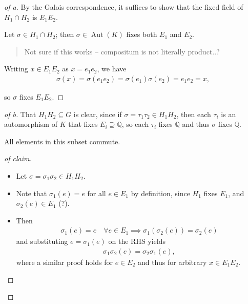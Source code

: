 \begin{solution}

\envlist

\begin{proof}[of a]

By the Galois correspondence, it suffices to show that the fixed field
of \(H_1 \cap H_2\) is \(E_1 E_2\).

Let \(\sigma \in H_1 \cap H_2\); then
\(\sigma \in {\operatorname{Aut}}(K)\) fixes both \(E_1\) and \(E_2\).

\begin{quote}
Not sure if this works -- compositum is not literally product..?
\end{quote}

Writing \(x \in E_1E_2\) as \(x=e_1 e_2\), we have
\begin{align*}
\sigma(x) = \sigma(e_1 e_2) = \sigma(e_1) \sigma(e_2) = e_1 e_2  =x,
\end{align*}

so \(\sigma\) fixes \(E_1 E_2\).

\end{proof}

\begin{proof}[of b]

That \(H_1 H_2 \subseteq G\) is clear, since if
\(\sigma = \tau_1 \tau_2 \in H_1 H_2\), then each \(\tau_i\) is an
automorphism of \(K\) that fixes \(E_i \supseteq {\mathbb{Q}}\), so each
\(\tau_i\) fixes \({\mathbb{Q}}\) and thus \(\sigma\) fixes
\({\mathbb{Q}}\).

\begin{claim}

All elements in this subset commute.

\end{claim}

\begin{proof}[of claim]

\envlist

\begin{itemize}
\item
  Let \(\sigma = \sigma_1 \sigma_2 \in H_1 H_2\).
\item
  Note that \(\sigma_1(e) = e\) for all \(e\in E_1\) by definition,
  since \(H_1\) fixes \(E_1\), and \(\sigma_2(e) \in E_1\) (?).
\item
  Then
  \begin{align*}
  \sigma_1(e) = e \quad \forall e \in E_1 \implies \sigma_1(\sigma_2(e)) = \sigma_2(e) 
  \end{align*}
  and substituting \(e = \sigma_1(e)\) on the RHS yields
  \begin{align*}
  \sigma_1 \sigma_2(e) = \sigma_2 \sigma_1(e)
  ,\end{align*}
  where a similar proof holds for \(e\in E_2\) and thus for arbitrary
  \(x\in E_1 E_2\).
\end{itemize}


\end{proof}
\end{proof}
\end{solution}
